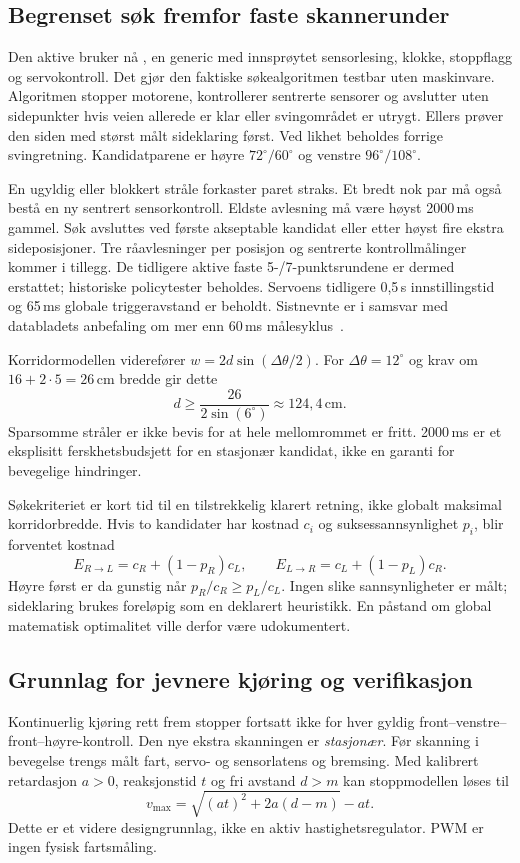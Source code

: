 \subsection{Begrenset søk fremfor faste skannerunder}
Den aktive  bruker nå , en generic
med innsprøytet sensorlesing, klokke, stoppflagg og servokontroll. Det gjør
den faktiske søkealgoritmen testbar uten maskinvare. Algoritmen stopper
motorene, kontrollerer sentrerte sensorer og avslutter uten sidepunkter hvis
veien allerede er klar eller svingområdet er utrygt. Ellers prøver den siden
med størst målt sideklaring først. Ved likhet beholdes forrige svingretning.
Kandidatparene er høyre $72^\circ/60^\circ$ og venstre $96^\circ/108^\circ$.

En ugyldig eller blokkert stråle forkaster paret straks. Et bredt nok par
må også bestå en ny sentrert sensorkontroll. Eldste avlesning må være høyst
2000\,ms gammel. Søk avsluttes ved første akseptable kandidat eller etter
høyst fire ekstra sideposisjoner. Tre råavlesninger per posisjon og
sentrerte kontrollmålinger kommer i tillegg. De tidligere aktive faste
5-/7-punktsrundene er dermed erstattet; historiske policytester beholdes.
Servoens tidligere 0,5\,s innstillingstid og 65\,ms globale triggeravstand
er beholdt. Sistnevnte er i samsvar med databladets anbefaling om mer enn
60\,ms målesyklus~\cite{hcsr04}.

Korridormodellen viderefører
$w=2d\sin(\Delta\theta/2)$. For $\Delta\theta=12^\circ$ og krav om
$16+2\cdot5=26$\,cm bredde gir dette
\[
 d\geq\frac{26}{2\sin(6^\circ)}\approx124{,}4\,\mathrm{cm}.
\]
Sparsomme stråler er ikke bevis for at hele mellomrommet er fritt.
2000\,ms er et eksplisitt ferskhetsbudsjett for en stasjonær kandidat,
ikke en garanti for bevegelige hindringer.

Søkekriteriet er kort tid til en tilstrekkelig klarert retning, ikke globalt
maksimal korridorbredde. Hvis to kandidater har kostnad $c_i$ og
suksessannsynlighet $p_i$, blir forventet kostnad
\[
 E_{R\rightarrow L}=c_R+(1-p_R)c_L,\qquad
 E_{L\rightarrow R}=c_L+(1-p_L)c_R.
\]
Høyre først er da gunstig når $p_R/c_R\geq p_L/c_L$. Ingen slike
sannsynligheter er målt; sideklaring brukes foreløpig som en deklarert
heuristikk. En påstand om global matematisk optimalitet ville derfor være
udokumentert.

\subsection{Grunnlag for jevnere kjøring og verifikasjon}
Kontinuerlig kjøring rett frem stopper fortsatt ikke for hver gyldig
front--venstre--front--høyre-kontroll. Den nye ekstra skanningen er
\emph{stasjonær}. Før skanning i bevegelse trengs målt fart, servo- og
sensorlatens og bremsing. Med kalibrert retardasjon $a>0$, reaksjonstid $t$
og fri avstand $d>m$ kan stoppmodellen løses til
\[
 v_{\max}=\sqrt{(at)^2+2a(d-m)}-at.
\]
Dette er et videre designgrunnlag, ikke en aktiv hastighetsregulator.
PWM er ingen fysisk fartsmåling.

